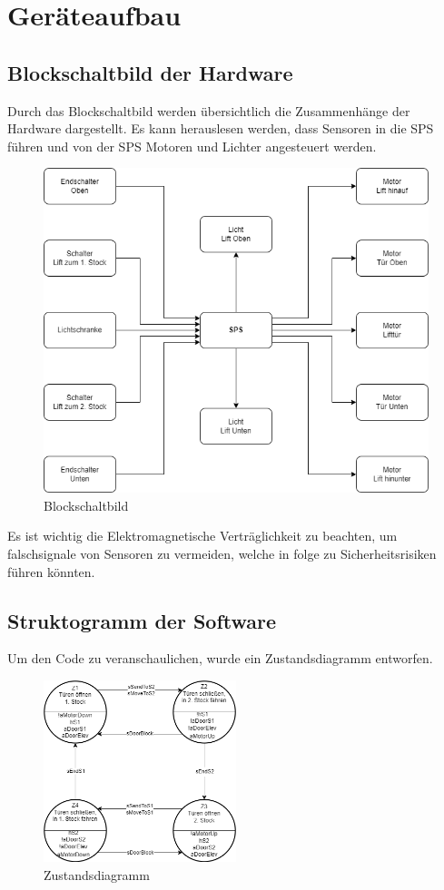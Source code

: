 \section{Geräteaufbau}

\subsection{Blockschaltbild der Hardware}

Durch das Blockschaltbild werden übersichtlich die Zusammenhänge der Hardware dargestellt. Es kann herauslesen werden, dass Sensoren in die SPS führen und von der SPS Motoren und Lichter angesteuert werden.

\begin{figure}[h!]
    \centering
    \includegraphics[width=\textwidth]{./images/Blockschaltbild.png}
    \caption[Blockschaltbild]{Blockschaltbild}
\end{figure}

Es ist wichtig die Elektromagnetische Verträglichkeit zu beachten, um falschsignale von Sensoren zu vermeiden, welche in folge zu Sicherheitsrisiken führen könnten.

\newpage

\subsection{Struktogramm der Software}

Um den Code zu veranschaulichen, wurde ein Zustandsdiagramm entworfen.

\begin{figure}[h!]
    \centering
    \includegraphics[width=0.5\textwidth]{./images/Zustandsdiagramm.png}
    \caption[Zustandsdiagramm]{Zustandsdiagramm}
\end{figure}